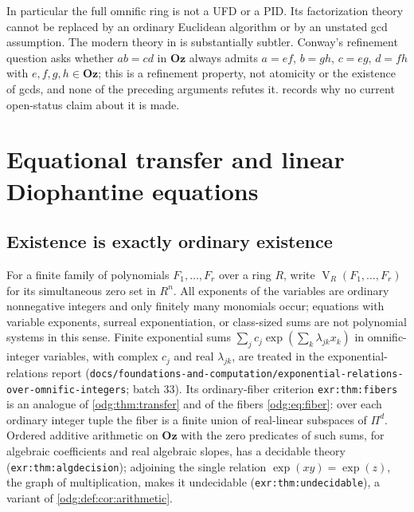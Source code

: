\documentclass[11pt,oneside]{article}
\numberwithin{equation}{section}
\theoremstyle{definition}
\theoremstyle{remark}
\newcommand{\Oz}{\mathbf{Oz}}
\newcommand{\V}{\operatorname V}
\newcommand{\replabel}[1]{\nolinkurl{#1}}
\newcommand{\fn}[1]{\nolinkurl{#1}}
\begin{document}
In particular the full omnific ring is not a UFD or a PID. Its factorization
theory cannot be replaced by an ordinary Euclidean algorithm or by an
unstated gcd assumption. The modern theory in \cite{LM} is substantially
subtler. Conway's refinement question asks whether $ab=cd$ in $\Oz$ always
admits $a=ef$, $b=gh$, $c=eg$, $d=fh$ with $e,f,g,h\in\Oz$; this is a
refinement property, not atomicity or the existence of gcds, and none of the
preceding arguments refutes it.  records why no current
open-status claim about it is made.

\section{Equational transfer and linear Diophantine equations}\label{odg:sec:transfer}

\subsection{Existence is exactly ordinary existence}

For a finite family of polynomials $F_1,\ldots,F_r$ over a ring $R$, write
$\V_R(F_1,\ldots,F_r)$ for its simultaneous zero set in $R^n$. All
exponents of the variables are ordinary nonnegative integers and only
finitely many monomials occur; equations with variable exponents, surreal
exponentiation, or class-sized sums are not polynomial systems in this sense.
Finite exponential sums $\sum_jc_j\exp(\sum_k\lambda_{jk}x_k)$ in
omnific-integer variables, with complex $c_j$ and real $\lambda_{jk}$, are
treated in the exponential-relations report
(\fn{docs/foundations-and-computation/exponential-relations-over-omnific-integers};
batch 33). Its ordinary-fiber criterion \replabel{exr:thm:fibers} is an
analogue of \cref{odg:thm:transfer} and of the fibers \eqref{odg:eq:fiber}:
over each ordinary integer tuple the fiber is a finite union of real-linear
subspaces of $\Pi^d$. Ordered additive arithmetic on $\Oz$ with the zero
predicates of such sums, for algebraic coefficients and real algebraic
slopes, has a decidable theory (\replabel{exr:thm:algdecision}); adjoining
the single relation $\exp(xy)=\exp(z)$, the graph of multiplication, makes it
undecidable (\replabel{exr:thm:undecidable}), a variant of
\cref{odg:def:cor:arithmetic}.
\end{document}
